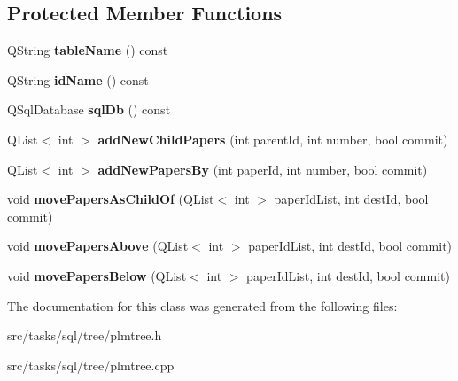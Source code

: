 \subsection*{Protected Member Functions}
\begin{DoxyCompactItemize}
\item 
Q\+String {\bfseries table\+Name} () const \hypertarget{class_p_l_m_tree_a4db68c2f87621e8c5c9312d50708e555}{}\label{class_p_l_m_tree_a4db68c2f87621e8c5c9312d50708e555}

\item 
Q\+String {\bfseries id\+Name} () const \hypertarget{class_p_l_m_tree_a51d5db6a6d3eaaee86c0f34dad9c937d}{}\label{class_p_l_m_tree_a51d5db6a6d3eaaee86c0f34dad9c937d}

\item 
Q\+Sql\+Database {\bfseries sql\+Db} () const \hypertarget{class_p_l_m_tree_a4f35a008994f96e0c6760f9777a39af9}{}\label{class_p_l_m_tree_a4f35a008994f96e0c6760f9777a39af9}

\item 
Q\+List$<$ int $>$ {\bfseries add\+New\+Child\+Papers} (int parent\+Id, int number, bool commit)\hypertarget{class_p_l_m_tree_a1663af74680cd9b833596f0967d2726e}{}\label{class_p_l_m_tree_a1663af74680cd9b833596f0967d2726e}

\item 
Q\+List$<$ int $>$ {\bfseries add\+New\+Papers\+By} (int paper\+Id, int number, bool commit)\hypertarget{class_p_l_m_tree_a451e4d8ca330b487405e1f0071770b82}{}\label{class_p_l_m_tree_a451e4d8ca330b487405e1f0071770b82}

\item 
void {\bfseries move\+Papers\+As\+Child\+Of} (Q\+List$<$ int $>$ paper\+Id\+List, int dest\+Id, bool commit)\hypertarget{class_p_l_m_tree_a6df2d0135fc295135c55178486e4643e}{}\label{class_p_l_m_tree_a6df2d0135fc295135c55178486e4643e}

\item 
void {\bfseries move\+Papers\+Above} (Q\+List$<$ int $>$ paper\+Id\+List, int dest\+Id, bool commit)\hypertarget{class_p_l_m_tree_a817dafc13f96873f27dbe29db3913105}{}\label{class_p_l_m_tree_a817dafc13f96873f27dbe29db3913105}

\item 
void {\bfseries move\+Papers\+Below} (Q\+List$<$ int $>$ paper\+Id\+List, int dest\+Id, bool commit)\hypertarget{class_p_l_m_tree_a39d23102d9bd34022f00fb2e55465efb}{}\label{class_p_l_m_tree_a39d23102d9bd34022f00fb2e55465efb}

\end{DoxyCompactItemize}


The documentation for this class was generated from the following files\+:\begin{DoxyCompactItemize}
\item 
src/tasks/sql/tree/plmtree.\+h\item 
src/tasks/sql/tree/plmtree.\+cpp\end{DoxyCompactItemize}
